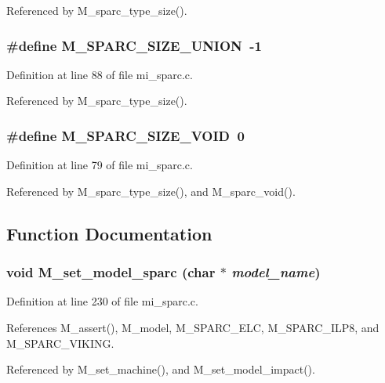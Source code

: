 Referenced by M\_\-sparc\_\-type\_\-size().
\subsubsection{\setlength{\rightskip}{0pt plus 5cm}\#define M\_\-SPARC\_\-SIZE\_\-UNION~-1}\label{mi__sparc_8c_83075740276643bc6443a7ff06a6291e}




Definition at line 88 of file mi\_\-sparc.c.

Referenced by M\_\-sparc\_\-type\_\-size().
\subsubsection{\setlength{\rightskip}{0pt plus 5cm}\#define M\_\-SPARC\_\-SIZE\_\-VOID~0}\label{mi__sparc_8c_60f4e4bd7112cec573144b769f6e663a}




Definition at line 79 of file mi\_\-sparc.c.

Referenced by M\_\-sparc\_\-type\_\-size(), and M\_\-sparc\_\-void().

\subsection{Function Documentation}
\subsubsection{\setlength{\rightskip}{0pt plus 5cm}void M\_\-set\_\-model\_\-sparc (char $\ast$ {\em model\_\-name})}\label{mi__sparc_8c_d5fc449ca458c27e4dd6cf9bda42baae}




Definition at line 230 of file mi\_\-sparc.c.

References M\_\-assert(), M\_\-model, M\_\-SPARC\_\-ELC, M\_\-SPARC\_\-ILP8, and M\_\-SPARC\_\-VIKING.

Referenced by M\_\-set\_\-machine(), and M\_\-set\_\-model\_\-impact().

